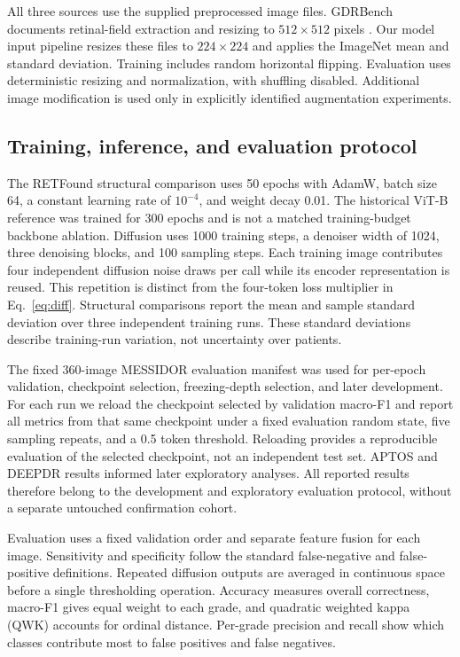 \documentclass[a4paper,fleqn]{cas-sc}
\begin{document}
All three sources use the supplied preprocessed image files. GDRBench documents retinal-field extraction and resizing to $512\times512$ pixels \citep{gdrbenchguide}. Our model input pipeline resizes these files to $224\times224$ and applies the ImageNet mean and standard deviation. Training includes random horizontal flipping. Evaluation uses deterministic resizing and normalization, with shuffling disabled. Additional image modification is used only in explicitly identified augmentation experiments.

\subsection{Training, inference, and evaluation protocol}

The RETFound structural comparison uses 50 epochs with AdamW, batch size 64, a constant learning rate of $10^{-4}$, and weight decay 0.01. The historical ViT-B reference was trained for 300 epochs and is not a matched training-budget backbone ablation. Diffusion uses 1000 training steps, a denoiser width of 1024, three denoising blocks, and 100 sampling steps. Each training image contributes four independent diffusion noise draws per call while its encoder representation is reused. This repetition is distinct from the four-token loss multiplier in Eq.~\eqref{eq:diff}. Structural comparisons report the mean and sample standard deviation over three independent training runs. These standard deviations describe training-run variation, not uncertainty over patients.

The fixed 360-image MESSIDOR evaluation manifest was used for per-epoch validation, checkpoint selection, freezing-depth selection, and later development. For each run we reload the checkpoint selected by validation macro-F1 and report all metrics from that same checkpoint under a fixed evaluation random state, five sampling repeats, and a 0.5 token threshold. Reloading provides a reproducible evaluation of the selected checkpoint, not an independent test set. APTOS and DEEPDR results informed later exploratory analyses. All reported results therefore belong to the development and exploratory evaluation protocol, without a separate untouched confirmation cohort.

Evaluation uses a fixed validation order and separate feature fusion for each image. Sensitivity and specificity follow the standard false-negative and false-positive definitions. Repeated diffusion outputs are averaged in continuous space before a single thresholding operation. Accuracy measures overall correctness, macro-F1 gives equal weight to each grade, and quadratic weighted kappa (QWK) accounts for ordinal distance. Per-grade precision and recall show which classes contribute most to false positives and false negatives.
\end{document}
